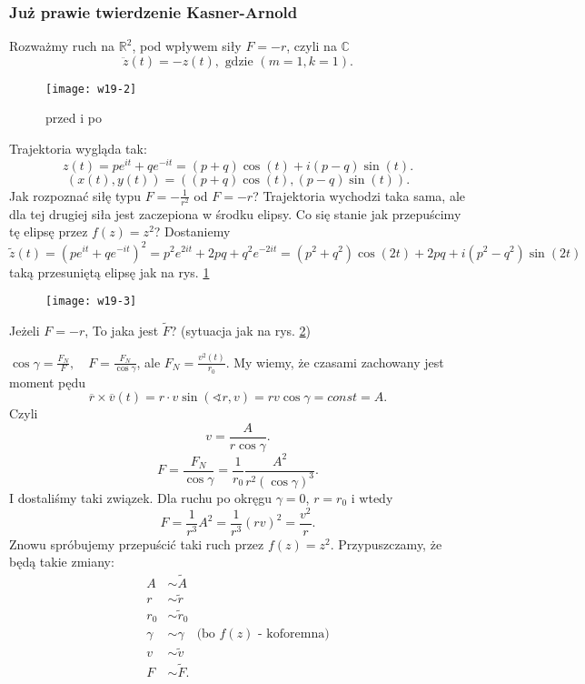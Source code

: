 \documentclass[../main.tex]{subfiles}
\begin{document}
\subsubsection{Już prawie twierdzenie Kasner-Arnold}
Rozważmy ruch na $\mathbb{R}^2$, pod wpływem siły $F = -r$, czyli na $\mathbb{C}$
 \[
     \ddot{z}(t) = -z(t),\text{ gdzie }\left( m = 1, k = 1 \right)
.\]
\begin{figure}[h]
    \centering
    \texttt{[image: w19-2]}
    \caption{przed i po}
    \label{fig:w19-2}
\end{figure}
Trajektoria wygląda tak:
\[
    z(t) = pe^{it} + qe^{-it} = \left( p+q \right) \cos(t) + i(p-q)\sin(t)
.\]
\[
    \left( x(t), y(t) \right) = \left((p+q)\cos(t), (p-q)\sin(t)\right)
.\]
Jak rozpoznać siłę typu $F = -\frac{1}{r^2}$ od $F = -r$? Trajektoria wychodzi taka sama, ale dla tej drugiej siła jest zaczepiona w środku elipsy. Co się stanie jak przepuścimy tę elipsę przez $f(z) = z^2$? Dostaniemy
\[
    \tilde z(t) = \left( p e^{it} + qe^{-it} \right) ^2 = p^2 e^{2it} + 2pq + q^2e^{-2it} = \left( p^2 + q^2 \right) \cos(2t) + 2pq + i(p^2 - q^2)\sin(2t)
\]
taką przesuniętą elipsę jak na rys. \ref{fig:w19-2}
\begin{pytanie}
    \begin{figure}[h]
        \centering
        \texttt{[image: w19-3]}
        \caption{}
        \label{fig:w19-3}
    \end{figure}
    Jeżeli $F = -r$, To jaka jest $\tilde F$? (sytuacja jak na rys. \ref{fig:w19-3})
\end{pytanie}
        $\cos\gamma = \frac{F_N}{F},\quad F = \frac{F_N}{\cos\gamma}$, ale $F_N = \frac{v^2(t)}{r_0}$. My wiemy, że czasami zachowany jest moment pędu
        \[
            \overline{r} \times \overline{v}(t) = r \cdot v \sin(\sphericalangle r, v) = r v \cos\gamma = const = A
        .\]
    Czyli
    \[
    v = \frac{A}{r \cos\gamma}
    .\]
\[
    F = \frac{F_N}{\cos\gamma} = \frac{1}{r_0}\frac{A^2}{r^2(\cos\gamma)^3}
.\]
I dostaliśmy taki związek. Dla ruchu po okręgu $\gamma = 0$,  $r = r_0$ i wtedy
\[
    F = \frac{1}{r^3}A^2 = \frac{1}{r^3}(r v)^2 = \frac{v^2}{r}
    .\]
Znowu spróbujemy przepuścić taki ruch przez $f(z) = z^2$. Przypuszczamy, że będą takie zmiany:
\begin{align*}
    A &\sim \tilde A\\
    r &\sim \tilde r\\
    r_0 &\sim \tilde r_0\\
    \gamma &\sim \gamma \quad \text{(bo $f(z)$ - koforemna)}\\
    v &\sim \tilde v\\
    F &\sim \tilde F
.\end{align*}
\end{document}
